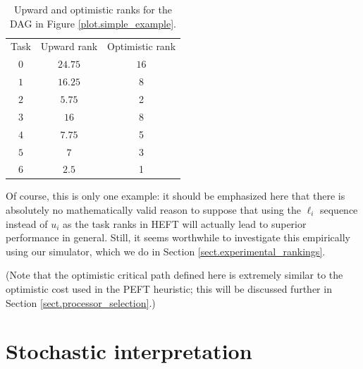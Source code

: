 \documentclass[12pt]{article}
\begin{document}
\begin{table}
	\caption{Upward and optimistic ranks for the DAG in Figure \ref{plot.simple_example}.} 
	\begin{center}	
		\begin{tabular}{c c c}
			\cmidrule{1-3}
			Task & Upward rank & Optimistic rank\\
			\cmidrule{1-3}
			$0$ & $24.75$ & $16$ \\
			$1$ & $16.25$ & 8 \\
			$2$ & $5.75$ & 2 \\
			$3$ & $16$ & 8 \\
			$4$ & $7.75$ & 5 \\
			$5$ & $7$ & 3 \\
			$6$ & $2.5$ & 1 \\
			\bottomrule
		\end{tabular}
		\label{tb.opt_example}
	\end{center}	
\end{table}

Of course, this is only one example: it should be emphasized here that there is absolutely no mathematically valid reason to suppose that using the $\ell_i$ sequence instead of $u_i$ as the task ranks in HEFT will actually lead to superior performance in general. Still, it seems worthwhile to investigate this empirically using our simulator, which we do in Section \ref{sect.experimental_rankings}. 


(Note that the optimistic critical path defined here is extremely similar to the optimistic cost used in the PEFT heuristic; this will be discussed further in Section \ref{sect.processor_selection}.)


\section{Stochastic interpretation}
\label{sect.alt_rankings}
\end{document}
